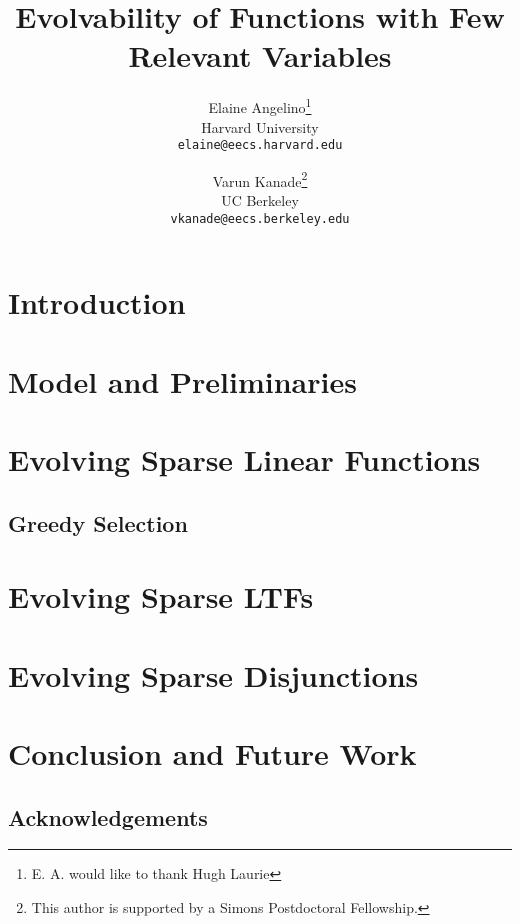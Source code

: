 \documentclass[11pt]{article}
\begin{document}
\title{Evolvability of Functions with Few Relevant Variables}
\author{Elaine Angelino\thanks{E. A. would like to thank Hugh Laurie} \\
Harvard University \\ \texttt{elaine@eecs.harvard.edu} \and Varun
Kanade\thanks{This author is supported by a Simons Postdoctoral Fellowship.} \\
UC Berkeley \\ \texttt{vkanade@eecs.berkeley.edu}}

\maketitle

\begin{abstract}

\end{abstract}

\newpage

\section{Introduction}


\section{Model and Preliminaries}


\section{Evolving Sparse Linear Functions}


\subsection{Greedy Selection}


\section{Evolving Sparse LTFs}


\section{Evolving Sparse Disjunctions}


\section{Conclusion and Future Work}


\subsection*{Acknowledgements} 



\end{document}
